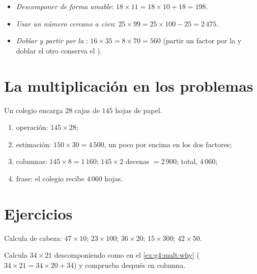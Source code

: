 \begin{example}\label{ex:g4:mult:tricks}
\begin{itemize}
  \item \emph{Descomponer de forma amable}: $18 \times 11 = 18 \times 10
        + 18 = 198$.
  \item \emph{Usar un número cercano a cien}: $25 \times 99 = 25 \times 100 -
        25 = 2\,475$.
  \item \emph{Doblar y partir por la }: $16 \times 35 = 8 \times 70 =
        560$ (partir un factor por la  y doblar el otro conserva el
        ).
\end{itemize}
\end{example}

\section{La multiplicación en los problemas}

\begin{example}\label{ex:g4:mult:problem}
Un colegio encarga $28$ cajas de $145$ hojas de papel.
\begin{enumerate}
  \item operación: $145 \times 28$;
  \item estimación: $150 \times 30 = 4\,500$, un poco por encima en los dos
        factores;
  \item columnas: $145 \times 8 = 1\,160$; $145 \times 2$ decenas
        $= 2\,900$; total, $4\,060$;
  \item frase: el colegio recibe $4\,060$ hojas.
\end{enumerate}
\end{example}

\section{Ejercicios}

\begin{exercise}[$\star$]\label{exo:g4:mult:1}
Calcula de cabeza: $47 \times 10$; \quad $23 \times 100$; \quad
$36 \times 20$; \quad $15 \times 300$; \quad $42 \times 50$.
\end{exercise}

\begin{exercise}[$\star$]\label{exo:g4:mult:2}
Calcula $34 \times 21$ descomponiendo como en el \cref{ex:g4:mult:why}
($34 \times 21 = 34 \times 20 + 34$) y comprueba después en columna.
\end{exercise}

